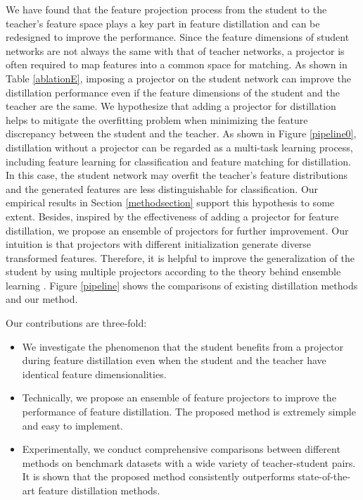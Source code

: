 \documentclass{article}
\begin{document}
We have found that the feature projection process from the student to the teacher's feature space plays a key part in feature distillation and can be redesigned to improve the performance. Since the feature dimensions of student networks are not always the same with that of teacher networks, a projector is often required to map features into a common space for matching. As shown in Table \ref{ablationE}, imposing a projector on the student network can improve the distillation performance even if the feature dimensions of the student and the teacher are the same. We hypothesize that adding a projector for distillation helps to mitigate the overfitting problem when minimizing the feature discrepancy between the student and the teacher. As shown in Figure \ref{pipeline0}, distillation without a projector can be regarded as a multi-task learning process, including feature learning for classification and feature matching for distillation. In this case, the student network may overfit the teacher's feature distributions and the generated features are less distinguishable for classification. Our empirical results in Section \ref{methodsection} support this hypothesis to some extent. %
Besides, inspired by the effectiveness of adding a projector for feature distillation, we propose an ensemble of projectors for further improvement. Our intuition is that projectors with different initialization generate diverse transformed features. Therefore, it is helpful to improve the generalization of the student by using multiple projectors according to the theory behind ensemble learning \cite{ensemblepaper2,ensemblepaper,zhi2}. %
Figure \ref{pipeline} shows the comparisons of existing distillation methods and our method. %

Our contributions are three-fold:
\begin{itemize}
\item We investigate the phenomenon that the student benefits from a projector during feature distillation even when the student and the teacher have identical feature dimensionalities. 
\item Technically, we propose an ensemble of feature projectors to improve the performance of feature distillation. The proposed method is extremely simple and easy to implement.
\item Experimentally, we conduct comprehensive comparisons between different methods on benchmark datasets with a wide variety of teacher-student pairs. It is shown that the proposed method consistently outperforms state-of-the-art feature distillation methods.
\end{itemize}
\end{document}
